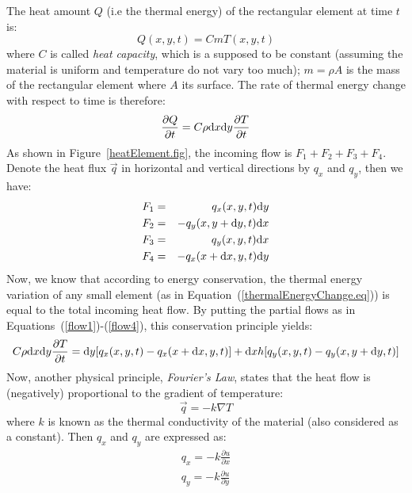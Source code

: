 \noindent The heat amount $Q$ (i.e the thermal energy) of the rectangular element at time $t$ is: 
\begin{equation}
Q(x,y,t)=C m T(x,y,t)
\end{equation}
where $C$ is called \emph{heat capacity}, which is a supposed to be constant (assuming the material is uniform and temperature do not vary too much); $m = \rho A$ is the mass of the rectangular element where $A$ its surface.
The rate of thermal energy change with respect to time is therefore:
\begin{equation}\label{thermalEnergyChange.eq}
\frac{\partial Q}{\partial t} = C\rho \mathrm d x \mathrm d y\frac{\partial T}{\partial t}
\end{equation}
As shown in Figure~\ref{heatElement.fig}, the incoming flow is $F_1 + F_2 + F_3 + F_4$. Denote the heat flux $\vec q$ in horizontal and vertical directions by $q_x$ and $q_y$, then we have:
\begin{eqnarray} %
F_1 &=& q_x(x,y,t)\ud y\label{flow1}\\
F_2 &=& -q_y(x,y+\ud y,t)\ud x\label{flow2}\\
F_3 &=& q_y(x,y,t)\ud x\label{flow3}\\
F_4 &=& -q_x(x+\ud x,y,t)\ud y\label{flow4}
\end{eqnarray}
Now, we know that according to energy conservation, the thermal energy variation of any small element (as in Equation~(\ref{thermalEnergyChange.eq})) is equal to the total incoming heat flow.  By putting the partial flows as in Equations~(\ref{flow1})-(\ref{flow4}), this conservation principle yields:
\begin{equation}\label{thermalEnergyChange.eq2}
C\rho \mathrm d x \mathrm d y\frac{\partial T}{\partial t} = \mathrm d y [q_x(x,y,t)-q_x(x+\mathrm d x,y,t)]+\mathrm d xh[q_y(x,y,t)-q_y(x,y+\mathrm d y,t)]
\end{equation}
Now, another physical principle, \emph{Fourier's Law}, states that the heat flow is (negatively) proportional to the gradient of temperature:
\begin{equation}\label{FourierLaw.eq}
\vec q = -k\nabla T
\end{equation}
where $k$ is known as the thermal conductivity of the material (also considered as a constant). Then $q_x$ and $q_y$ are expressed as:
\begin{equation}
\begin{split}
q_x=-k\frac{\partial u}{\partial x}\\
q_y=-k\frac{\partial u}{\partial y}
\end{split}
\end{equation}
